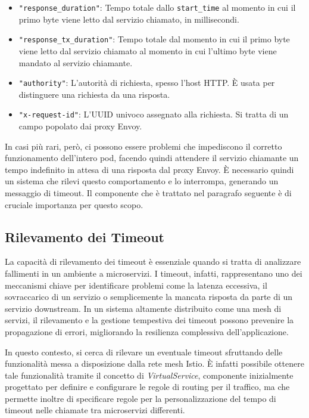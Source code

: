 \begin{itemize}
\item \texttt{"response\_duration"}: Tempo totale dallo \texttt{start\_time} al momento in cui il primo byte viene letto dal servizio chiamato, in millisecondi.

\item \texttt{"response\_tx\_duration"}: Tempo totale dal momento in cui il primo byte viene letto dal servizio chiamato al momento in cui l’ultimo byte viene mandato al servizio chiamante.

\item \texttt{"authority"}: L'autorità di richiesta, spesso l'host HTTP. È usata per distinguere una richiesta da una risposta.

\item \texttt{"x-request-id"}: L'UUID univoco assegnato alla richiesta. Si tratta di un campo popolato dai proxy Envoy.

\end{itemize}

In casi più rari, però, ci possono essere problemi che impediscono il corretto funzionamento dell'intero pod, facendo quindi attendere il servizio chiamante un tempo indefinito in attesa di una risposta dal proxy Envoy. È necessario quindi un sistema che rilevi questo comportamento e lo interrompa, generando un messaggio di timeout. Il componente che è trattato nel paragrafo seguente è di cruciale importanza per questo scopo.


\subsection{Rilevamento dei Timeout}\label{subsect:Istio Virtual Service}
La capacità di rilevamento dei timeout è essenziale quando si tratta di analizzare fallimenti in un ambiente a microservizi. I timeout, infatti, rappresentano uno dei meccanismi chiave per identificare problemi come la latenza eccessiva, il sovraccarico di un servizio o semplicemente la mancata risposta da parte di un servizio downstream. In un sistema altamente distribuito come una mesh di servizi, il rilevamento e la gestione tempestiva dei timeout possono prevenire la propagazione di errori, migliorando la resilienza complessiva dell'applicazione.

In questo contesto, si cerca di rilevare un eventuale timeout sfruttando delle funzionalità messa a disposizione dalla rete mesh Istio.
È infatti possibile ottenere tale funzionalità tramite il concetto di \textit{VirtualService}, componente inizialmente progettato per definire e configurare le regole di routing per il traffico, ma che permette inoltre di specificare regole per la personalizzazione del tempo di timeout nelle chiamate tra microservizi differenti.

